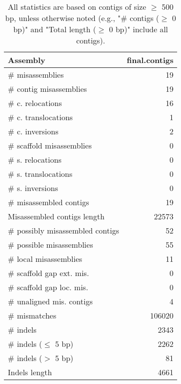 \documentclass[12pt,a4paper]{article}
\begin{document}
\begin{table}[ht]
\begin{center}
\caption{All statistics are based on contigs of size $\geq$ 500 bp, unless otherwise noted (e.g., "\# contigs ($\geq$ 0 bp)" and "Total length ($\geq$ 0 bp)" include all contigs).}
\begin{tabular}{|l*{1}{|r}|}
\hline
Assembly & final.contigs \\ \hline
\# misassemblies & 19 \\ \hline
\hspace{2mm}\# contig misassemblies & 19 \\ \hline
\hspace{5mm}\# c. relocations & 16 \\ \hline
\hspace{5mm}\# c. translocations & 1 \\ \hline
\hspace{5mm}\# c. inversions & 2 \\ \hline
\hspace{2mm}\# scaffold misassemblies & 0 \\ \hline
\hspace{5mm}\# s. relocations & 0 \\ \hline
\hspace{5mm}\# s. translocations & 0 \\ \hline
\hspace{5mm}\# s. inversions & 0 \\ \hline
\# misassembled contigs & 19 \\ \hline
Misassembled contigs length & 22573 \\ \hline
\# possibly misassembled contigs & 52 \\ \hline
\hspace{5mm}\# possible misassemblies & 55 \\ \hline
\# local misassemblies & 11 \\ \hline
\# scaffold gap ext. mis. & 0 \\ \hline
\# scaffold gap loc. mis. & 0 \\ \hline
\# unaligned mis. contigs & 4 \\ \hline
\# mismatches & 106020 \\ \hline
\# indels & 2343 \\ \hline
\hspace{5mm}\# indels ($\leq$ 5 bp) & 2262 \\ \hline
\hspace{5mm}\# indels ($>$ 5 bp) & 81 \\ \hline
Indels length & 4661 \\ \hline
\end{tabular}
\end{center}
\end{table}
\end{document}
